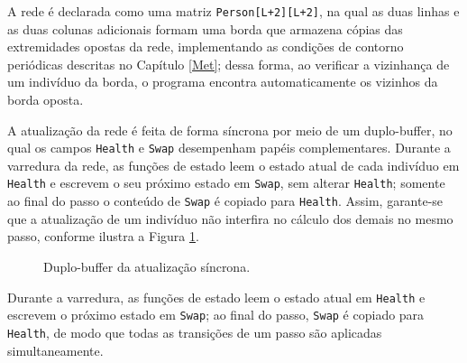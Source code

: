 A rede é declarada como uma matriz \texttt{Person[L+2][L+2]}, na qual as duas linhas e as duas colunas adicionais formam uma borda que armazena cópias das extremidades opostas da rede, implementando as condições de contorno periódicas descritas no Capítulo \ref{Met}; dessa forma, ao verificar a vizinhança de um indivíduo da borda, o programa encontra automaticamente os vizinhos da borda oposta.

A atualização da rede é feita de forma síncrona por meio de um duplo-buffer, no qual os campos \texttt{Health} e \texttt{Swap} desempenham papéis complementares. Durante a varredura da rede, as funções de estado leem o estado atual de cada indivíduo em \texttt{Health} e escrevem o seu próximo estado em \texttt{Swap}, sem alterar \texttt{Health}; somente ao final do passo o conteúdo de \texttt{Swap} é copiado para \texttt{Health}. Assim, garante-se que a atualização de um indivíduo não interfira no cálculo dos demais no mesmo passo, conforme ilustra a Figura \ref{fig:duplobuffer}.

\begin{figure}[H]
\centering
\caption{Duplo-buffer da atualização síncrona.}
\label{fig:duplobuffer}
\end{figure}

Durante a varredura, as funções de estado leem o estado atual em \texttt{Health} e escrevem o próximo estado em \texttt{Swap}; ao final do passo, \texttt{Swap} é copiado para \texttt{Health}, de modo que todas as transições de um passo são aplicadas simultaneamente.


